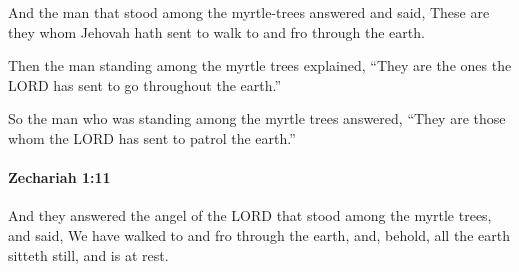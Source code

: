 			\begin{versebox}
					\item[BHS] 
					\item[LXX] 
					\item[ASV] And the man that stood among the myrtle-trees answered and said, These are they whom Jehovah hath sent to walk to and fro through the earth.
					\item[NIV] Then the man standing among the myrtle trees explained, “They are the ones the LORD has sent to go throughout the earth.”
					\item[NRSV] So the man who was standing among the myrtle trees answered, “They are those whom the LORD has sent to patrol the earth.”
			\end{versebox}

		\paragraph{Zechariah 1:11} %
			\label{ZECHARIAH-1-11}

			And they answered the angel of the LORD that stood among the myrtle trees, and said, We have walked to and fro through the earth, and, behold, all the earth sitteth still, and is at rest.

